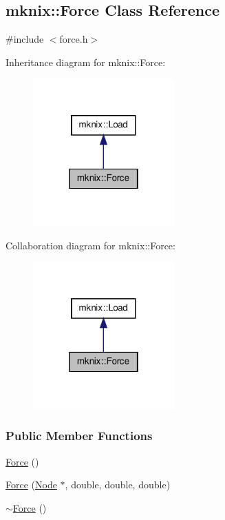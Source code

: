 \hypertarget{classmknix_1_1_force}{\subsection{mknix\-:\-:Force Class Reference}
\label{classmknix_1_1_force}
}


{\ttfamily \#include $<$force.\-h$>$}



Inheritance diagram for mknix\-:\-:Force\-:\nopagebreak
\begin{figure}[H]
\begin{center}
\leavevmode
\includegraphics[width=154pt]{d4/df8/classmknix_1_1_force__inherit__graph}
\end{center}
\end{figure}


Collaboration diagram for mknix\-:\-:Force\-:\nopagebreak
\begin{figure}[H]
\begin{center}
\leavevmode
\includegraphics[width=154pt]{d6/de1/classmknix_1_1_force__coll__graph}
\end{center}
\end{figure}
\subsubsection*{Public Member Functions}
\begin{DoxyCompactItemize}
\item 
\hyperlink{classmknix_1_1_force_ab785d976ebb824b7a8404916657f5097}{Force} ()
\item 
\hyperlink{classmknix_1_1_force_a6d00b4232959ddd151e239b278423600}{Force} (\hyperlink{classmknix_1_1_node}{Node} $\ast$, double, double, double)
\item 
\hyperlink{classmknix_1_1_force_a517004e90c90d84150b3570b74fdcce8}{$\sim$\-Force} ()
\end{DoxyCompactItemize}
